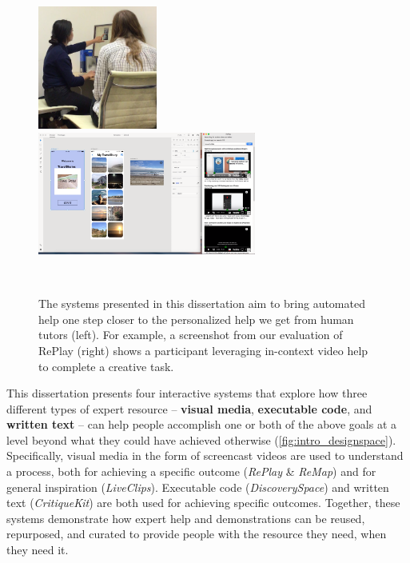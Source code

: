 \begin{figure}[b!]
\centering
  \includegraphics[width=0.35\textwidth]{figures/tutor.png}
  \hfill
  \includegraphics[width=0.64\textwidth]{figures/study.png}
  \caption{The systems presented in this dissertation aim to bring automated help one step closer to the personalized help we get from human tutors (left). For example, a screenshot from our evaluation of RePlay (right) shows a participant leveraging in-context video help to complete a creative task. }~\label{fig:intro_picture}
\end{figure}

This dissertation presents four interactive systems that explore how three different types of expert resource -- \textbf{visual media}, \textbf{executable code}, and \textbf{written text} -- can help people accomplish one or both of the above goals at a level beyond what they could have achieved otherwise (\autoref{fig:intro_designspace}). Specifically, visual media in the form of screencast videos are used to understand a process, both for achieving a specific outcome (\textit{RePlay} \& \textit{ReMap}) and for general inspiration (\textit{LiveClips}). Executable code (\textit{DiscoverySpace}) and written text (\textit{CritiqueKit}) are both used for achieving specific outcomes. Together, these systems demonstrate how expert help and demonstrations can be reused, repurposed, and curated to provide people with the resource they need, when they need it.


